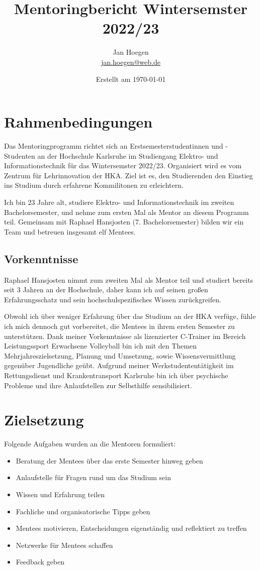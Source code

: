 \documentclass[
    paper=a4,
    div=calc,
    numbers=noendperiod,
    twocolumn,
]{scrartcl}
\title{Mentoringbericht Wintersemster 2022/23}
\author{Jan Hoegen\\\href{mailto:jan.hoegen@web.de}{jan.hoegen@web.de}}
\date{Erstellt am \today}
\begin{document}
\maketitle


\section{Rahmenbedingungen}
    Das Mentoringprogramm richtet sich an Erstsemesterstudentinnen und -Studenten an der Hochschule Karlsruhe im Studiengang Elektro- und Informationstechnik für das Wintersemster 2022/23. Organisiert wird es vom Zentrum für Lehrinnovation der HKA. Ziel ist es, den Studierenden den Einstieg ins Studium durch erfahrene Kommilitonen zu erleichtern.

    Ich bin 23 Jahre alt, studiere Elektro- und Informationstechnik im zweiten Bachelorsemester, und nehme zum ersten Mal als Mentor an diesem Programm teil. Gemeinsam mit Raphael Hansjosten (7. Bachelorsemester) bilden wir ein Team und betreuen insgesamt elf Mentees. 

    \subsection*{Vorkenntnisse}
        Raphael Hansjosten nimmt zum zweiten Mal als Mentor teil und studiert bereits seit 3 Jahren an der Hochschule, daher kann ich auf seinen großen Erfahrungsschatz und sein hochschulspezifisches Wissen zurückgreifen. 

        Obwohl ich über weniger Erfahrung über das Studium an der HKA verfüge, fühle ich mich dennoch gut vorbereitet, die Mentees in ihrem ersten Semester zu unterstützen. Dank meiner Vorkenntnisse als lizenzierter C-Trainer im Bereich Leistungssport Erwachsene Volleyball bin ich mit den Themen Mehrjahreszielsetzung, Planung und Umsetzung, sowie Wissensvermittlung gegenüber Jugendliche geübt.  
        Aufgrund meiner Werkstudententätigkeit im Rettungsdienst und Krankentransport Karlsruhe bin ich über psychische Probleme und ihre Anlaufstellen zur Selbsthilfe sensibilisiert.  
 
\section{Zielsetzung}
    Folgende Aufgaben wurden an die Mentoren formuliert:

    \begin{itemize}
        \item Beratung der Mentees über das erste Semester hinweg geben
        \item Anlaufstelle für Fragen rund um das Studium sein
        \item Wissen und Erfahrung teilen
        \item Fachliche und organisatorische Tipps geben
        \item Mentees motivieren, Entscheidungen eigenständig und reflektiert zu treffen
        \item Netzwerke für Mentees schaffen
        \item Feedback geben
    \end{itemize}
\end{document}
